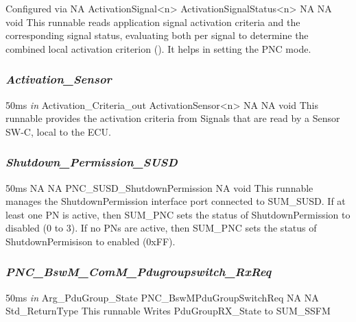 {Configured via }
{NA}
{ActivationSignal<n> \newline ActivationSignalStatus<n>}
{NA}
{NA}
{void}
{This runnable reads application signal activation criteria and the corresponding signal status, evaluating both per signal to determine the combined local activation criterion (). It helps in setting the PNC mode.}

{}

\subsubsection{\textit{Activation_Sensor}}

{50ms}
{ \textit{in} \hspace*{1.5in} \vrule \hspace*{0.1in} Activation_Criteria_out}
{ActivationSensor<n>}
{NA}
{NA}
{void}
{This runnable provides the activation criteria from Signals that are read by a Sensor SW-C, local to the ECU.}

{}

\subsubsection{\textit{Shutdown_Permission_SUSD}}

{50ms}
{NA}
{NA}
{PNC_SUSD_ShutdownPermission}
{NA}
{void}
{This runnable manages the ShutdownPermission interface port connected to SUM_SUSD. If at least one PN is active, then SUM_PNC sets the status of ShutdownPermission to disabled (0 to 3). If no PNs are active, then SUM_PNC sets the status of ShutdownPermisison to enabled (0xFF).}

{ }

\subsubsection{\textit{PNC_BswM_ComM_Pdugroupswitch_RxReq}}

{50ms}
{\textit{in} \hspace*{1.5in} \vrule \hspace*{0.1in} Arg_PduGroup_State}
{PNC_BswMPduGroupSwitchReq}
{NA}
{NA}
{Std_ReturnType}
{This runnable Writes PduGroupRX_State to SUM_SSFM}

